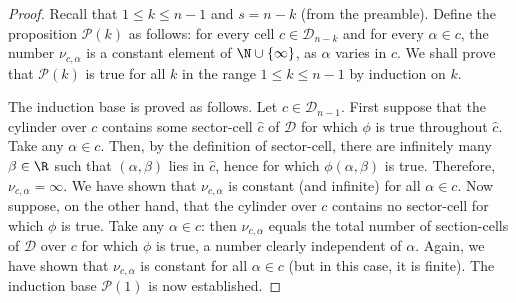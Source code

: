 \documentclass{article}
\begin{document}
\begin{proof}
    Recall that $1 \le k \le n-1$ and $s = n - k$ (from the preamble). 
    Define the proposition
    $\mathcal{P}(k)$ as follows: for every cell $c \in \mathcal{D}_{n-k}$
    and for every $\alpha \in c$, the number $\nu_{c, \alpha}$
    is a constant element of $\N \cup \{\infty\}$, as $\alpha$
    varies in $c$. We shall prove that $\mathcal{P}(k)$ is true for all
    $k$ in the range $1 \le k \le n-1$ by induction on $k$.

    The induction base is proved as follows.
    Let $c \in \mathcal{D}_{n-1}$. First suppose that the cylinder over $c$
    contains some sector-cell $\hat{c}$ of $\mathcal{D}$
    for which $\phi$ is true throughout $\hat{c}$.
    Take any $\alpha \in c$.
    Then, by the definition of sector-cell,
    there are infinitely many $\beta \in \R$ such that
    $(\alpha, \beta)$ lies in $\hat{c}$, hence for which
    $\phi(\alpha, \beta)$ is true.
    Therefore, $\nu_{c, \alpha} = \infty$.
    We have shown that $\nu_{c, \alpha}$ is constant (and infinite)
    for all $\alpha \in c$.
    Now suppose, on the other hand, that the cylinder over $c$
    contains no sector-cell for which $\phi$ is true.
    Take any $\alpha \in c$: then $\nu_{c, \alpha}$ equals the total number of section-cells
    of $\mathcal{D}$ over $c$ for which $\phi$ is true, a number clearly
    independent of $\alpha$. Again, we have shown that $\nu_{c, \alpha}$
    is constant for all $\alpha \in c$ (but in this case, it is finite).
    The induction base $\mathcal{P}(1)$ is now established.


\end{proof}
\end{document}
